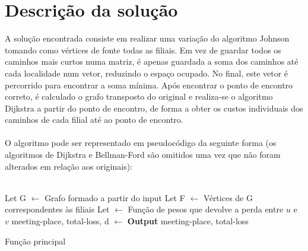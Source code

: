 \documentclass[12pt,a4paper,notitlepage]{article}
\begin{document}
\section{Descrição da solução}
A solução encontrada consiste em realizar uma variação do algoritmo Johnson tomando como vértices de fonte todas as filiais.
Em vez de guardar todos os caminhos mais curtos numa matriz, é apenas guardada a soma dos caminhos até cada localidade num vetor, reduzindo o espaço ocupado.
No final, este vetor é percorrido para encontrar a soma mínima. 
Após encontrar o ponto de encontro correto, é calculado o grafo transposto do original e realiza-se o algoritmo Dijkstra a partir do ponto de encontro, de forma a obter os custos individuais dos caminhos de cada filial até ao ponto de encontro.
\\
\\
O algoritmo pode ser representado em pseudocódigo da seguinte forma (os algoritmos de Dijkstra e Bellman-Ford são omitidos uma vez que não foram alterados em relação aos originais):
\\
\\
\begin{algorithm}
    Let G $\leftarrow$ Grafo formado a partir do input\;
    Let F $\leftarrow$ Vértices de G correspondentes às filiais\;
    Let  $\leftarrow$ Função de pesos que devolve a perda entre $u$ e $v$\;
    meeting-place, total-loss, d $\leftarrow$ \;
    {
        \textbf{Output} meeting-place, total-loss\;
    }
    \caption{Função principal}
\end{algorithm}
\\
\\
\end{document}
